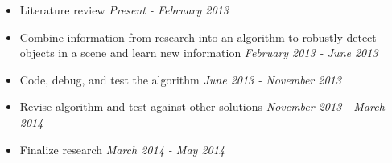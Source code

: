 \begin{itemize}
\item Literature review
\subitem \emph{Present - February 2013}


\item Combine information from research into an algorithm to robustly detect objects in a scene and learn new information
\subitem \emph{February 2013 - June 2013}

\item Code, debug, and test the algorithm
\subitem \emph{June 2013 - November 2013}

\item Revise algorithm and test against other solutions
\subitem \emph{November 2013 - March 2014}

\item Finalize research
\subitem \emph{March 2014 - May 2014}
\end{itemize}